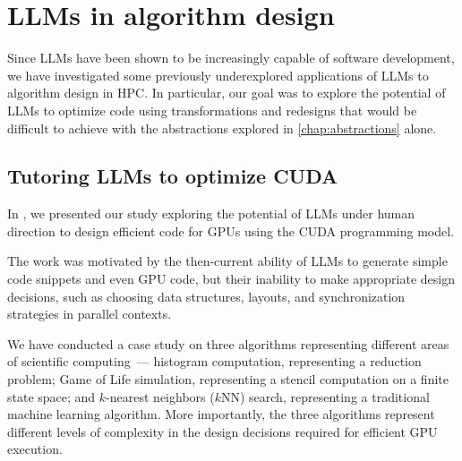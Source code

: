 \chapter{LLMs in algorithm design}\label{chap:llms}

Since LLMs have been shown to be increasingly capable of software development, we have investigated some previously underexplored applications of LLMs to algorithm design in HPC\@. In particular, our goal was to explore the potential of LLMs to optimize code using transformations and redesigns that would be difficult to achieve with the abstractions explored in \cref{chap:abstractions} alone.


\section{Tutoring LLMs to optimize CUDA}\label{sec:human-directed-code-optimization}

In , we presented our study exploring the potential of LLMs under human direction to design efficient code for GPUs using the CUDA programming model.

The work was motivated by the then-current ability of LLMs to generate simple code snippets and even GPU code, but their inability to make appropriate design decisions, such as choosing data structures, layouts, and synchronization strategies in parallel contexts.

We have conducted a case study on three algorithms representing different areas of scientific computing~--- histogram computation, representing a reduction problem; Game of Life simulation, representing a stencil computation on a finite state space; and \(k\)-nearest neighbors (\(k\)NN) search, representing a traditional machine learning algorithm. More importantly, the three algorithms represent different levels of complexity in the design decisions required for efficient GPU execution.


